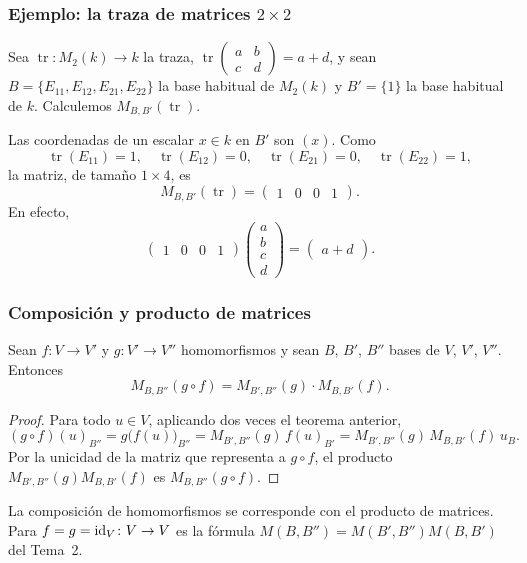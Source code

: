 \begin{frame}
    \frametitle{Ejemplo: la traza de matrices $2\times2$}

    \begin{example}
        Sea $\operatorname{tr}\colon M_2(k)\to k$ la traza,
        $\operatorname{tr}\left(\begin{smallmatrix}a&b\\c&d\end{smallmatrix}\right)=a+d$, y sean
        $B=\{E_{11},E_{12},E_{21},E_{22}\}$ la base habitual de $M_2(k)$ y
        $B'=\{1\}$ la base habitual de $k$. Calculemos
        $M_{B,B'}(\operatorname{tr})$.
    \end{example}

    Las coordenadas de un escalar $x\in k$ en $B'$ son $(x)$. Como
    \[
        \operatorname{tr}(E_{11})=1,\quad \operatorname{tr}(E_{12})=0,\quad
        \operatorname{tr}(E_{21})=0,\quad \operatorname{tr}(E_{22})=1,
    \]
    la matriz, de tamaño $1\times4$, es
    \[
        M_{B,B'}(\operatorname{tr})=
        \begin{pmatrix}1&0&0&1\end{pmatrix}.
    \]
    En efecto,
    \[
        \begin{pmatrix}1&0&0&1\end{pmatrix}
        \begin{pmatrix}a\\b\\c\\d\end{pmatrix}=\begin{pmatrix}a+d\end{pmatrix}.
    \]
\end{frame}


\begin{frame}
    \frametitle{Composición y producto de matrices}

    \begin{theorem}
        Sean $f\colon V\to V'$ y $g\colon V'\to V''$ homomorfismos y sean
        $B$, $B'$, $B''$ bases de $V$, $V'$, $V''$. Entonces
        \[
            M_{B,B''}(g\circ f)=M_{B',B''}(g)\cdot M_{B,B'}(f).
        \]
    \end{theorem}

    \begin{proof}
        Para todo $u\in V$, aplicando dos veces el teorema anterior,
        \[
            (g\circ f)(u)_{B''}=g\bigl(f(u)\bigr)_{B''}
            =M_{B',B''}(g)\,f(u)_{B'}
            =M_{B',B''}(g)\,M_{B,B'}(f)\,u_B.
        \]
        Por la unicidad de la matriz que representa a $g\circ f$, el
        producto $M_{B',B''}(g)M_{B,B'}(f)$ es $M_{B,B''}(g\circ f)$.
    \end{proof}

    \medskip

    La composición de homomorfismos se corresponde con el \alert{producto}
    de matrices. Para $f=g=\operatorname{id}_V\colon V\to V$ es la fórmula
    $M(B,B'')=M(B',B'')M(B,B')$ del Tema~2.
\end{frame}


